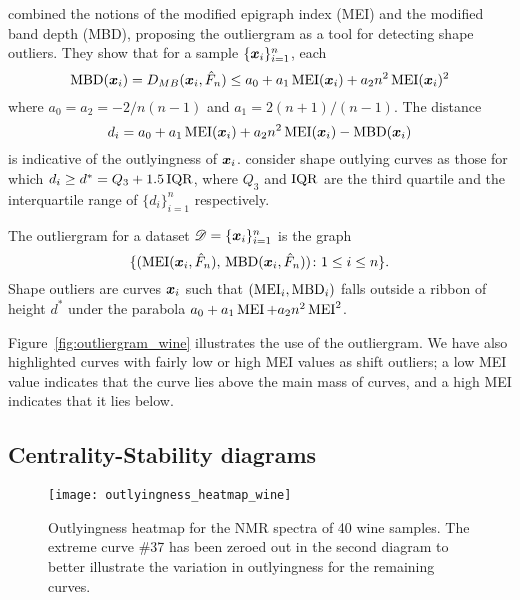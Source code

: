 \textcite{gil-romo-2014} combined the notions of the modified epigraph index
(MEI) and the modified band depth (MBD), proposing the outliergram as a tool
for detecting shape outliers.
They show that for a sample $\{\bm{x}_i\}_{i = 1}^n$, each
\begin{equation}
    \operatorname{MBD}(\bm{x}_i) = D_{MB}(\bm{x}_i, \hat{F}_n) \leq a_0 + a_1 \operatorname{MEI}(\bm{x}_i) + a_2 n^2 \operatorname{MEI}(\bm{x}_i)^2
\end{equation}
where $a_0 = a_2 = -2/n(n - 1)$ and $a_1 = 2(n + 1)/(n - 1)$.
The distance
\begin{equation}
    d_i = a_0 + a_1 \operatorname{MEI}(\bm{x}_i) + a_2 n^2 \operatorname{MEI}(\bm{x}_i) - \operatorname{MBD}(\bm{x}_i)
\end{equation}
is indicative of the outlyingness of $\bm{x}_i$.
\textcite{gil-romo-2014} consider shape outlying curves as those for which
$d_i \geq d^* = Q_3 + 1.5\operatorname{IQR}$, where $Q_3$ and $\operatorname{IQR}$ are the third quartile
and the interquartile range of $\{d_i\}_{i = 1}^n$ respectively.

\begin{definition}[Outliergram]
    The outliergram for a dataset $\mathscr{D} = \{\bm{x}_i\}_{i = 1}^n$ is the
    graph
    \begin{equation}
        \{(\operatorname{MEI}(\bm{x}_i, \hat{F}_n),\, \operatorname{MBD}(\bm{x}_i, \hat{F}_n))\colon 1 \leq i \leq n\}.
    \end{equation}
    Shape outliers are curves $\bm{x}_i$ such that $(\operatorname{MEI}_i, \operatorname{MBD}_i)$ falls
    outside a ribbon of height $d^*$ under the parabola $a_0 + a_1 \operatorname{MEI} +
    a_2n^2\operatorname{MEI}^2$.
\end{definition}

Figure~\ref{fig:outliergram_wine} illustrates the use of the outliergram.
We have also highlighted curves with fairly low or high MEI values as shift
outliers; a low MEI value indicates that the curve lies above the main mass of
curves, and a high MEI indicates that it lies below.


\subsection{Centrality-Stability diagrams}

\begin{figure}
    \centering
    \texttt{[image: outlyingness\_heatmap\_wine]}
    \caption{
        Outlyingness heatmap for the NMR spectra of 40 wine samples.
        The extreme curve \#37 has been zeroed out in the second diagram to
        better illustrate the variation in outlyingness for the remaining
        curves.
    }
    \label{fig:outlyingness_heatmap_wine}
\end{figure}

